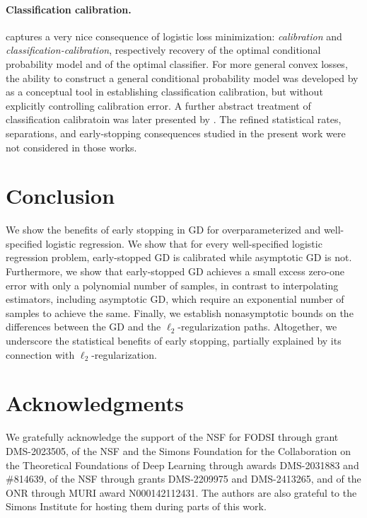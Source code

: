 \documentclass[11pt]{article}
\begin{document}
\paragraph{Classification calibration.}  
captures a very nice consequence of logistic loss minimization:
\emph{calibration} and \emph{classification-calibration}, respectively
recovery of the optimal conditional probability model and of the
optimal classifier.  For more general convex losses, the ability
to construct a general conditional probability model was
developed by \citet{zhang_consistency} as a conceptual tool in establishing
classification calibration, but without explicitly controlling
calibration error. A further abstract treatment of classification
calibratoin was later presented by \citet{bartlett_jordan_mcauliffe}.
The refined statistical rates, separations, and early-stopping
consequences studied in the present work were not considered in those
works.

\section{Conclusion}
We show the benefits of early stopping in GD for overparameterized and well-specified logistic regression. We show that for every well-specified logistic regression problem, early-stopped GD is calibrated while asymptotic GD is not. 
Furthermore, we show that early-stopped GD achieves a small excess zero-one error with only a polynomial number of samples, in contrast to interpolating estimators, including asymptotic GD, which require an exponential number of samples to achieve the same.  
Finally, we establish nonasymptotic bounds on the differences between the GD and the $\ell_2$-regularization paths.
Altogether, we underscore the statistical benefits of early stopping, partially explained by its connection with $\ell_2$-regularization.


\section*{Acknowledgments}
We gratefully acknowledge the support of the NSF for FODSI through grant DMS-2023505, of the NSF and the Simons Foundation for the Collaboration on the Theoretical Foundations of Deep Learning through awards DMS-2031883 and \#814639, of the NSF through grants DMS-2209975 and DMS-2413265, and of the ONR through MURI award N000142112431.
The authors are also grateful to the Simons Institute for hosting them during
parts of this work.
\end{document}
